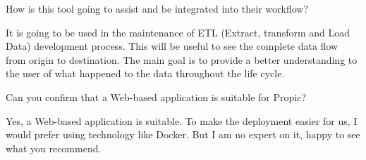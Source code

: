 \begin{spacing}{1.3}
\begin{QandA}
    \item How is this tool going to assist and be integrated into their workflow?
    \begin{answered}
        It is going to be used in the maintenance of ETL (Extract, transform and Load Data) development process. This will be useful to see the complete data flow from origin to destination. The main goal is to provide a better understanding to the user of what happened to the data throughout the life cycle.
    \end{answered}
    
    \item Can you confirm that a Web-based application is suitable for Propic?
    \begin{answered}
        Yes, a Web-based application is suitable. To make the deployment easier for us, I would prefer using technology like Docker. But I am no expert on it, happy to see what you recommend.
    \end{answered}
\end{QandA}

\end{spacing}